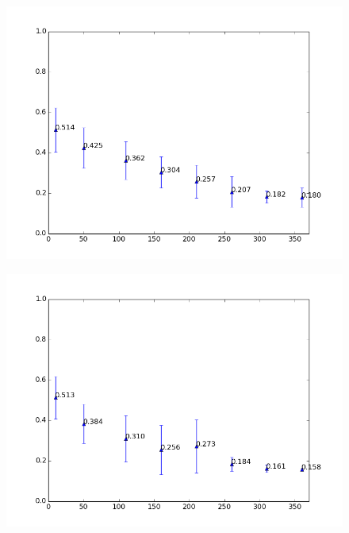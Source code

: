 \begin{figure}[h!]
	\centering
	\begin{minipage}{.49\linewidth}
		\includegraphics[width=\linewidth]{fig/spambase/eps0.1,budg=eps,peers10,groups10,reg2e-2-pubAll-spam-baseline-data10-360-testset-withoutlocalmodel}
		\label{fig:data_limit_test_withoutlocalmodel}
	\end{minipage}
	\hspace{.001\linewidth}
	\begin{minipage}{.49\linewidth}
		\includegraphics[width=\linewidth]{fig/spambase/eps0.1,budg=eps,peers10,groups10,reg2e-2-pubAll-spam-baseline-data10-360-testset-withlocalmodel}

\end{minipage}
\end{figure}
